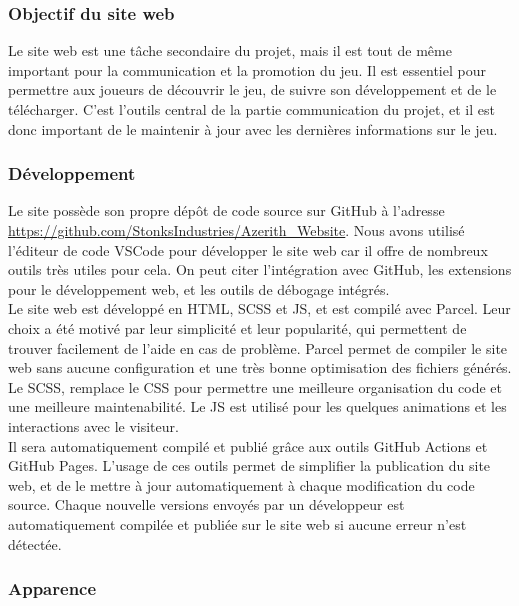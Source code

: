 

\subsubsection{Objectif du site web}

Le site web est une tâche secondaire du projet, mais il est tout de même important pour la communication et la promotion du jeu.
Il est essentiel pour permettre aux joueurs de découvrir le jeu, de suivre son développement et de le télécharger.
C'est l'outils central de la partie communication du projet, et il est donc important de le maintenir à jour avec les dernières informations sur le jeu.

\subsubsection{Développement}

Le site possède son propre dépôt de code source sur GitHub à l'adresse \url{https://github.com/StonksIndustries/Azerith_Website}.
Nous avons utilisé l'éditeur de code VSCode pour développer le site web car il offre de nombreux outils très utiles pour cela.
On peut citer l'intégration avec GitHub, les extensions pour le développement web, et les outils de débogage intégrés.
\\

Le site web est développé en HTML, SCSS et JS, et est compilé avec Parcel.
Leur choix a été motivé par leur simplicité et leur popularité, qui permettent de trouver facilement de l'aide en cas de problème.
Parcel permet de compiler le site web sans aucune configuration et une très bonne optimisation des fichiers générés.
Le SCSS, remplace le CSS pour permettre une meilleure organisation du code et une meilleure maintenabilité.
Le JS est utilisé pour les quelques animations et les interactions avec le visiteur.
\\

Il sera automatiquement compilé et publié grâce aux outils GitHub Actions et GitHub Pages.
L'usage de ces outils permet de simplifier la publication du site web, et de le mettre à jour automatiquement à chaque modification du code source.
Chaque nouvelle versions envoyés par un développeur est automatiquement compilée et publiée sur le site web si aucune erreur n'est détectée.

\subsubsection{Apparence}

